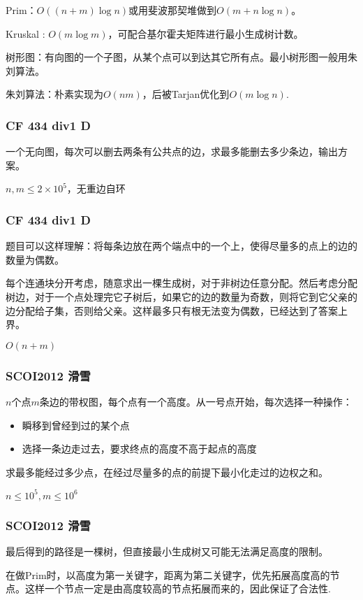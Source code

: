 \documentclass[10pt]{beamer}
\begin{document}
\begin{CJK}{UTF8}{gkai}
\begin{spacing}{1.1}
\begin{frame}
	Prim：$O((n + m) \log n)$或用斐波那契堆做到$O(m + n \log n)$。

	Kruskal : $O(m \log m)$，可配合基尔霍夫矩阵进行最小生成树计数。\pause

	树形图：有向图的一个子图，从某个点可以到达其它所有点。最小树形图一般用朱刘算法。\pause

	朱刘算法：朴素实现为$O(nm)$，后被Tarjan优化到$O(m \log n)$.

\end{frame}

\begin{frame}
\frametitle{CF 434 div1 D}
	一个无向图，每次可以删去两条有公共点的边，求最多能删去多少条边，输出方案。

	$n, m \le 2 \times 10^5$，无重边自环
\end{frame}

\begin{frame}
\frametitle{CF 434 div1 D}

	题目可以这样理解：将每条边放在两个端点中的一个上，使得尽量多的点上的边的数量为偶数。\pause

	每个连通块分开考虑，随意求出一棵生成树，对于非树边任意分配。然后考虑分配树边，对于一个点处理完它子树后，如果它的边的数量为奇数，则将它到它父亲的边分配给子集，否则给父亲。这样最多只有根无法变为偶数，已经达到了答案上界。

	$O(n + m)$

\end{frame}

\begin{frame}
\frametitle{SCOI2012 滑雪}

	$n$个点$m$条边的带权图，每个点有一个高度。从一号点开始，每次选择一种操作：

	\begin{itemize}
		\item 瞬移到曾经到过的某个点
		\item 选择一条边走过去，要求终点的高度不高于起点的高度
	\end{itemize}

	求最多能经过多少点，在经过尽量多的点的前提下最小化走过的边权之和。

	$n \le 10^5, m \le 10^6$

\end{frame}

\begin{frame}
\frametitle{SCOI2012 滑雪}

	最后得到的路径是一棵树，但直接最小生成树又可能无法满足高度的限制。\pause

	在做Prim时，以高度为第一关键字，距离为第二关键字，优先拓展高度高的节点。这样一个节点一定是由高度较高的节点拓展而来的，因此保证了合法性.


\end{frame}
\end{spacing}
\end{CJK}
\end{document}
